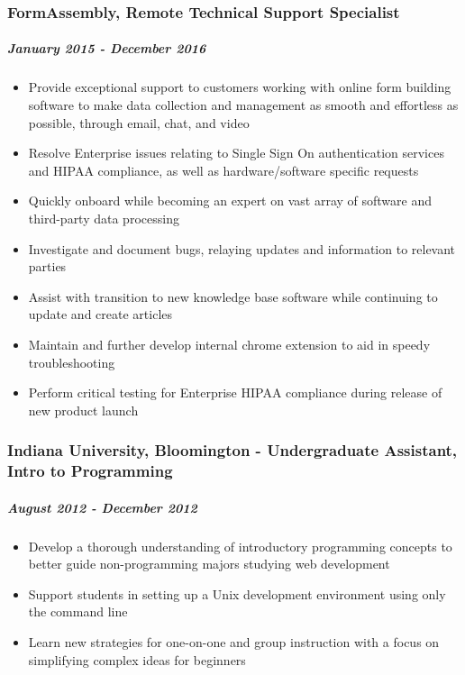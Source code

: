 \documentclass[11pt]{article}
\begin{document}
\subsubsection*{FormAssembly, Remote Technical Support Specialist}
\label{sec:org25ffcf5}
\subparagraph*{\emph{January 2015 - December 2016}}
\label{sec:org006df1b}
\begin{itemize}
\item Provide exceptional support to customers working with online form building software to make data collection and management as smooth and effortless as possible, through email, chat, and video
\item Resolve Enterprise issues relating to Single Sign On authentication services and HIPAA compliance, as well as hardware/software specific requests
\item Quickly onboard while becoming an expert on vast array of software and third-party data processing
\item Investigate and document bugs, relaying updates and information to relevant parties
\item Assist with transition to new knowledge base software while continuing to update and create articles
\item Maintain and further develop internal chrome extension to aid in speedy troubleshooting
\item Perform critical testing for Enterprise HIPAA compliance during release of new product launch
\end{itemize}
\subsubsection*{Indiana University, Bloomington - Undergraduate Assistant, Intro to Programming}
\label{sec:org5687965}
\subparagraph*{\emph{August 2012 - December 2012}}
\label{sec:org8ebcca5}
\begin{itemize}
\item Develop a thorough understanding of introductory programming concepts to better guide non-programming majors studying web development
\item Support students in setting up a Unix development environment using only the command line
\item Learn new strategies for one-on-one and group instruction with a focus on simplifying complex ideas for beginners
\end{itemize}
\end{document}
